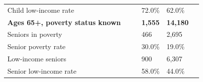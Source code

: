 \documentclass[9pt]{report}
\begin{document}
\begin{tabular}{p{.10in}p{.10in}p{.10in}p{3.7in}>{\hfill}p{.85in}>{\hfill}p{.85in}>{\hfill}p{.85in}>{\hfill}p{.85in}p{0.1in}}
\multicolumn{4}{l}{\parbox{3.6in}{\strut\raggedright{{Child low-income rate}}\strut}} &  &  & 72.0\% & 62.0\% & \multicolumn{1}{l}{}  \\ 
\multicolumn{4}{l}{\parbox{3.5in}{\strut\raggedright{\textbf{Ages 65+, poverty status known}\strut}}} & \textbf{} & \textbf{} & \textbf{1,555} & \textbf{14,180} & \textbf{} \\ 
\multicolumn{4}{l}{\parbox{3.6in}{\strut\raggedright{{Seniors in poverty}}\strut}} &  &  & 466 & 2,695 & \multicolumn{1}{l}{}  \\ 
\multicolumn{4}{l}{\parbox{3.6in}{\strut\raggedright{{Senior poverty rate}}\strut}} &  &  & 30.0\% & 19.0\% & \multicolumn{1}{l}{}  \\ 
\multicolumn{4}{l}{\parbox{3.6in}{\strut\raggedright{{Low-income seniors}}\strut}} &  &  & 900 & 6,307 & \multicolumn{1}{l}{}  \\ 
\multicolumn{4}{l}{\parbox{3.6in}{\strut\raggedright{{Senior low-income rate}}\strut}} &  &  & 58.0\% & 44.0\% & \multicolumn{1}{l}{}  \\ 

\end{tabular}
\setlength{\tabcolsep}{6pt} %
\end{document}
